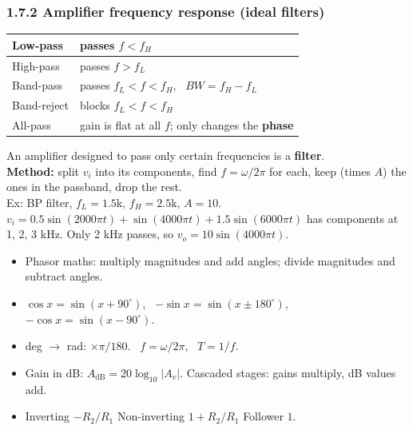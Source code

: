     \subsubsection{1.7.2 Amplifier frequency response (ideal filters)}
    {\centering
    \hfill
    \hfill
    \hfill
    \hfill
    \par}
    \vspace{3pt}
    \begin{tabularx}{\linewidth}{|l|L|}
        \hline
        Low-pass & passes $f < f_H$ \\ \hline
        High-pass & passes $f > f_L$ \\ \hline
        Band-pass & passes $f_L < f < f_H$, \ $BW = f_H - f_L$ \\ \hline
        Band-reject & blocks $f_L < f < f_H$ \\ \hline
        All-pass & gain is flat at all $f$; only changes the \textbf{phase} \\ \hline
    \end{tabularx}
    An amplifier designed to pass only certain frequencies is a \textbf{filter}. \\
    \textbf{Method:} split $v_i$ into its components, find $f = \omega/2\pi$ for each, keep (times $A$) the ones in the passband, drop the rest.\\
    Ex: BP filter, $f_L = 1.5$k, $f_H = 2.5$k, $A = 10$. $v_i = 0.5\sin(2000\pi t) + \sin(4000\pi t) + 1.5\sin(6000\pi t)$ has components at 1, 2, 3 kHz. Only 2 kHz passes, so $v_o = 10\sin(4000\pi t)$.

    \begin{handy}
        \begin{itemize}
            \item Phasor maths: multiply magnitudes and add angles; divide magnitudes and subtract angles.
            \item $\cos x = \sin(x+90^\circ)$, \ $-\sin x = \sin(x\pm180^\circ)$, \ $-\cos x = \sin(x - 90^\circ)$.
            \item deg $\to$ rad: $\times\pi/180$. \ $f = \omega/2\pi$, \ $T = 1/f$.
            \item Gain in dB: $A_{\mathrm{dB}} = 20\log_{10}|A_v|$. Cascaded stages: gains multiply, dB values add.
            \item Inverting $-R_2/R_1$ \quad Non-inverting $1 + R_2/R_1$ \quad Follower $1$.
        \end{itemize}
    \end{handy}

